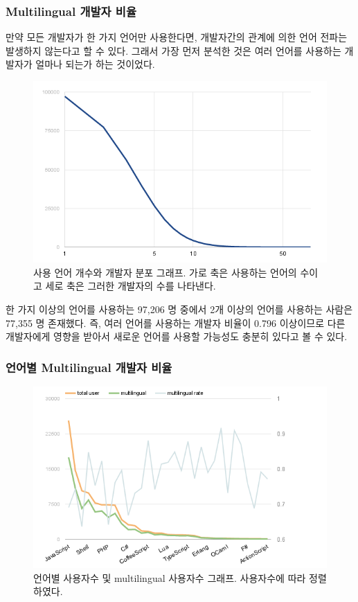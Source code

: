 \documentclass[10pt, a4paper, titlepage]{article}
\begin{document}
\subsubsection{Multilingual 개발자 비율}

만약 모든 개발자가 한 가지 언어만 사용한다면, 개발자간의 관계에 의한 언어 전파는 발생하지 않는다고 할 수 있다. 그래서 가장 먼저 분석한 것은 여러 언어를 사용하는 개발자가 얼마나 되는가 하는 것이었다.

\begin{figure}
\includegraphics[width=\textwidth]{image10}
\caption{사용 언어 개수와 개발자 분포 그래프. 가로 축은 사용하는 언어의 수이고 세로 축은 그러한 개발자의 수를 나타낸다.}
\label{fig:langnum}
\end{figure}

한 가지 이상의 언어를 사용하는 97,206 명 중에서 2개 이상의 언어를 사용하는 사람은 77,355 명 존재했다. 즉, 여러 언어를 사용하는 개발자 비율이 0.796 이상이므로 다른 개발자에게 영향을 받아서 새로운 언어를 사용할 가능성도 충분히 있다고 볼 수 있다.

\subsubsection{언어별 Multilingual 개발자 비율}

\begin{figure}[ht]
\includegraphics[width=\textwidth]{image04}
\caption{언어별 사용자수 및 multilingual 사용자수 그래프. 사용자수에 따라 정렬하였다.}
\label{fig:multilingual}
\end{figure}
\end{document}
